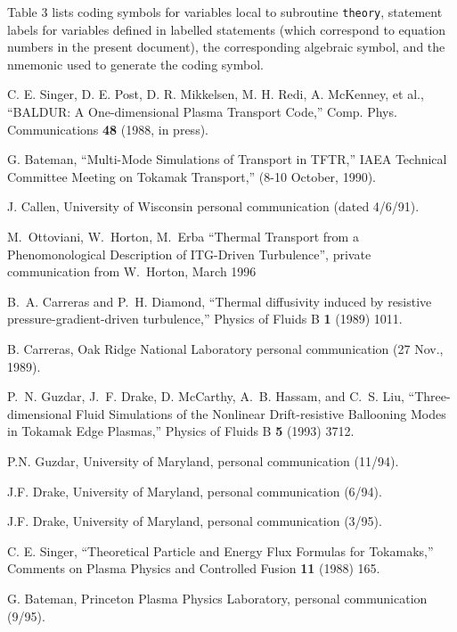 Table 3 lists coding symbols for
variables local to subroutine {\tt theory}, statement labels for variables
defined in labelled statements (which correspond to
equation numbers in the present document), the
corresponding algebraic symbol, and the nmemonic
used to generate the coding symbol.
 

\begin{thebibliography}{99}

 C. E. Singer, D. E. Post, D. R. Mikkelsen,
M. H. Redi, A. McKenney, et al., ``BALDUR: A One-dimensional
Plasma Transport Code,'' Comp. Phys. Communications {\bf 48}
(1988, in press).

 G. Bateman, ``Multi-Mode Simulations of Transport
in TFTR,'' IAEA Technical Committee Meeting on Tokamak Transport,''
(8-10 October, 1990).

 J. Callen, University
of Wisconsin personal communication (dated 4/6/91).

M.~Ottoviani, W.~Horton, M.~Erba
``Thermal Transport from a Phenomonological Description of ITG-Driven
Turbulence'', private communication from W.~Horton, March 1996

B.~A. Carreras and P.~H. Diamond,
``Thermal diffusivity induced by resistive pressure-gradient-driven
turbulence,'' Physics of Fluids B {\bf 1} (1989) 1011.

 B. Carreras, Oak Ridge National Laboratory personal
communication (27 Nov., 1989).

P.~N. Guzdar, J.~F. Drake, D. McCarthy, A.~B. Hassam, and C.~S. Liu,
``Three-dimensional Fluid Simulations of the Nonlinear Drift-resistive
Ballooning Modes in Tokamak Edge Plasmas,'' Physics of Fluids B {\bf 5}
(1993) 3712.

 P.N. Guzdar, University of Maryland, personal communication
 (11/94).

 J.F. Drake, University of Maryland, personal
communication (6/94).

 J.F. Drake, University of Maryland, personal
communication (3/95).

 C. E. Singer, ``Theoretical Particle and Energy
Flux Formulas for Tokamaks,'' Comments on Plasma Physics and Controlled
Fusion {\bf 11} (1988) 165.

 G. Bateman, Princeton Plasma Physics Laboratory, 
personal communication (9/95).


\end{thebibliography}
